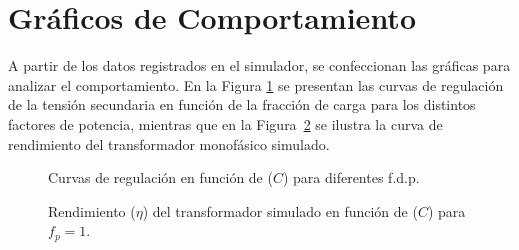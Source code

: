 \section{Gráficos de Comportamiento}

A partir de los datos registrados en el simulador, se confeccionan las gráficas para analizar el comportamiento. En la
Figura \ref{fig.ej1:plot_regulacion} se presentan las curvas de regulación de la tensión secundaria en función de la
fracción de carga para los distintos factores de potencia, mientras que en la Figura~\ref{fig.ej1:plot_rendimiento} se
ilustra la curva de rendimiento del transformador monofásico simulado.

\begin{figure}[!ht]
    \centering
    
    \caption{Curvas de regulación en función de ($C$) para diferentes f.d.p.}
    \label{fig.ej1:plot_regulacion}
\end{figure}

\begin{figure}[!ht]
    \centering
    
    \caption{Rendimiento ($\eta$) del transformador simulado en función de ($C$) para $f_p = 1$.}
    \label{fig.ej1:plot_rendimiento}
\end{figure}

